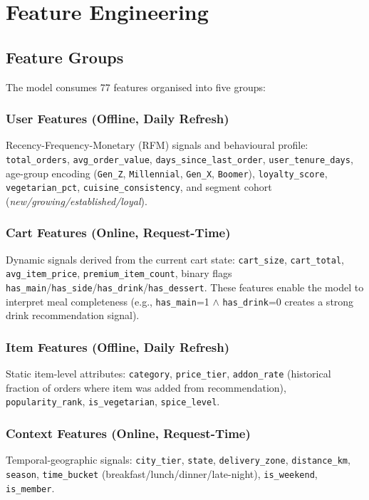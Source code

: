 \documentclass[conference]{IEEEtran}
\begin{document}
\section{Feature Engineering}

\subsection{Feature Groups}

The model consumes 77 features organised into five groups:

\subsubsection{User Features (Offline, Daily Refresh)}
Recency-Frequency-Monetary (RFM) signals and behavioural profile:
\texttt{total\_orders}, \texttt{avg\_order\_value},
\texttt{days\_since\_last\_order}, \texttt{user\_tenure\_days},
age-group encoding (\texttt{Gen\_Z}, \texttt{Millennial}, \texttt{Gen\_X},
\texttt{Boomer}), \texttt{loyalty\_score}, \texttt{vegetarian\_pct},
\texttt{cuisine\_consistency}, and segment cohort (\textit{new/growing/established/loyal}).

\subsubsection{Cart Features (Online, Request-Time)}
Dynamic signals derived from the current cart state:
\texttt{cart\_size}, \texttt{cart\_total}, \texttt{avg\_item\_price},
\texttt{premium\_item\_count}, binary flags
\texttt{has\_main}/\texttt{has\_side}/\texttt{has\_drink}/\texttt{has\_dessert}.
These features enable the model to interpret meal completeness (e.g.,
\texttt{has\_main}=1 $\wedge$ \texttt{has\_drink}=0 creates a strong drink
recommendation signal).

\subsubsection{Item Features (Offline, Daily Refresh)}
Static item-level attributes: \texttt{category}, \texttt{price\_tier},
\texttt{addon\_rate} (historical fraction of orders where item was added from
recommendation), \texttt{popularity\_rank}, \texttt{is\_vegetarian},
\texttt{spice\_level}.

\subsubsection{Context Features (Online, Request-Time)}
Temporal-geographic signals: \texttt{city\_tier}, \texttt{state},
\texttt{delivery\_zone}, \texttt{distance\_km}, \texttt{season},
\texttt{time\_bucket} (breakfast/lunch/dinner/late-night),
\texttt{is\_weekend}, \texttt{is\_member}.
\end{document}
